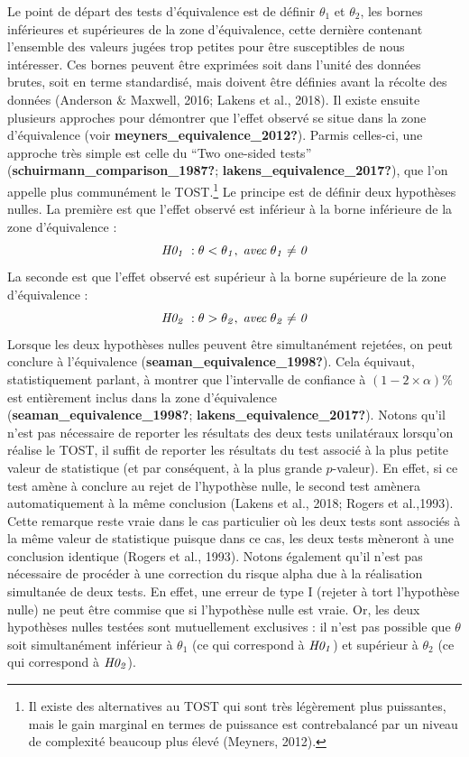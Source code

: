 \documentclass[
  english,
  man]{apa6}
\begin{document}
Le point de départ des tests d'équivalence est de définir \(\theta_1\) et \(\theta_2\), les bornes inférieures et supérieures de la zone d'équivalence, cette dernière contenant l'ensemble des valeurs jugées trop petites pour être susceptibles de nous intéresser. Ces bornes peuvent être exprimées soit dans l'unité des données brutes, soit en terme standardisé, mais doivent être définies avant la récolte des données (Anderson \(\&\) Maxwell, 2016; Lakens et al., 2018). Il existe ensuite plusieurs approches pour démontrer que l'effet observé se situe dans la zone d'équivalence (voir \textbf{meyners\_equivalence\_2012?}). Parmis celles-ci, une approche très simple est celle du ``Two one-sided tests'' (\textbf{schuirmann\_comparison\_1987?}; \textbf{lakens\_equivalence\_2017?}), que l'on appelle plus communément le TOST.\footnote{Il existe des alternatives au TOST qui sont très légèrement plus puissantes, mais le gain marginal en termes de puissance est contrebalancé par un niveau de complexité beaucoup plus élevé (Meyners, 2012).} Le principe est de définir deux hypothèses nulles. La première est que l'effet observé est inférieur à la borne inférieure de la zone d'équivalence : \[\it H0_1\;: \theta < \theta_1, \; avec \; \theta_1 \neq 0\] La seconde est que l'effet observé est supérieur à la borne supérieure de la zone d'équivalence : \[\it H0_2\;: \theta > \theta_2, \; avec \; \theta_2 \neq 0\] Lorsque les deux hypothèses nulles peuvent être simultanément rejetées, on peut conclure à l'équivalence (\textbf{seaman\_equivalence\_1998?}). Cela équivaut, statistiquement parlant, à montrer que l'intervalle de confiance à \((1-2\times\alpha)\%\) est entièrement inclus dans la zone d'équivalence (\textbf{seaman\_equivalence\_1998?}; \textbf{lakens\_equivalence\_2017?}). Notons qu'il n'est pas nécessaire de reporter les résultats des deux tests unilatéraux lorsqu'on réalise le TOST, il suffit de reporter les résultats du test associé à la plus petite valeur de statistique (et par conséquent, à la plus grande \(p\)-valeur). En effet, si ce test amène à conclure au rejet de l'hypothèse nulle, le second test amènera automatiquement à la même conclusion (Lakens et al., 2018; Rogers et al.,1993). Cette remarque reste vraie dans le cas particulier où les deux tests sont associés à la même valeur de statistique puisque dans ce cas, les deux tests mèneront à une conclusion identique (Rogers et al., 1993). Notons également qu'il n'est pas nécessaire de procéder à une correction du risque alpha due à la réalisation simultanée de deux tests. En effet, une erreur de type I (rejeter à tort l'hypothèse nulle) ne peut être commise que si l'hypothèse nulle est vraie. Or, les deux hypothèses nulles testées sont mutuellement exclusives : il n'est pas possible que \(\theta\) soit simultanément inférieur à \(\theta_1\) (ce qui correspond à \(\it H0_1\)) et supérieur à \(\theta_2\) (ce qui correspond à \(\it H0_2\)).
\end{document}
